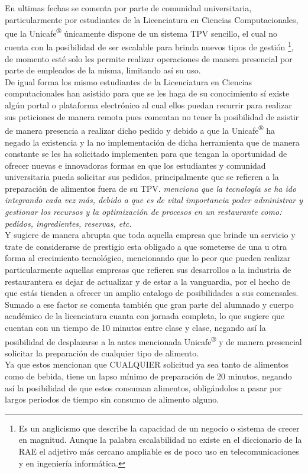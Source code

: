 \begin{large}
En ultimas fechas se comenta por parte de comunidad universitaria, particularmente por estudiantes de la Licenciatura en Ciencias Computacionales, que la Unicafe\textsuperscript{®} únicamente dispone de un sistema TPV sencillo, el cual no cuenta con la posibilidad de ser escalable para brinda nuevos tipos de gestión \footnote{Es un anglicismo que describe la capacidad de un negocio o sistema de crecer en magnitud. Aunque la palabra escalabilidad no existe en el diccionario de la RAE el adjetivo más cercano ampliable es de poco uso en telecomunicaciones y en ingeniería informática.}, de momento esté solo les permite realizar operaciones de manera presencial por parte de empleados de la misma, limitando así su uso.
\\
De igual forma los mismo estudiantes de la Licenciatura en Ciencias computacionales han asistido para que se les haga de su conocimiento sí existe algún portal o plataforma electrónico al cual ellos puedan recurrir para realizar sus peticiones de manera remota pues comentan no tener la posibilidad de asistir de manera presencia a realizar dicho pedido y debido a que la Unicafe\textsuperscript{®} ha negado la existencia y la no implementación de dicha herramienta que de manera constante se les ha solicitado implementen para que tengan la oportunidad de ofrecer nuevas e innovadoras formas en que los estudiantes y comunidad universitaria pueda solicitar sus pedidos, principalmente que se refieren a la preparación de alimentos fuera de su TPV. \cite{Mun} \emph{menciona que la tecnología se ha ido integrando cada vez más, debido a que es de vital importancia poder administrar y gestionar los recursos y la optimización de procesos en un restaurante como: pedidos, ingredientes, reservas, etc.}
\\
Y sugiere de manera abrupta que toda aquella empresa que brinde un servicio y trate de considerarse de prestigio esta obligado a que someterse de una u otra forma al crecimiento tecnológico, mencionando que lo peor que pueden realizar particularmente aquellas empresas que refieren sus desarrollos a la industria de restaurantera es dejar de actualizar y de estar a la vanguardia, por el hecho de que estás tienden a ofrecer un amplio catalogo de posibilidades a sus comensales.
\\
Sumado a ese factor se comenta también que gran parte del alumnado y cuerpo académico de la licenciatura cuanta con jornada completa, lo que sugiere que cuentan con un tiempo de 10 minutos entre clase y clase, negando así la posibilidad de desplazarse a la antes mencionada Unicafe\textsuperscript{®} y de manera presencial solicitar la preparación de cualquier tipo de alimento. 
\\
Ya que estos mencionan que CUALQUIER solicitud ya sea tanto de alimentos como de bebida, tiene un lapso mínimo de preparación de 20 minutos, negando así la posibilidad de que estos consuman alimentos, obligándolos a pasar por largos periodos de tiempo sin consumo de alimento alguno.


\end{large}
